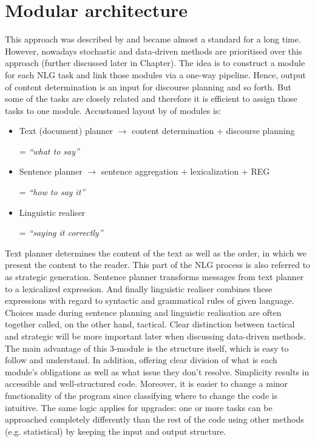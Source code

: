 \section{Modular architecture}\label{section:modules}
This approach was described by \cite{reiter1997building} and became almost a standard for a long time. However, nowadays stochastic and data-driven methods are prioritised over this approach (further discussed later in Chapter). The idea is to construct a module for each NLG task and link those modules via a one-way pipeline. Hence, output of content determination is an input for discourse planning and so forth. But some of the tasks are closely related and therefore it is efficient to assign those tasks to one module. Accustomed layout by \cite{reiter1997building} of modules is: 
\begin{itemize}
	\item Text (document) planner $\rightarrow$ content determination + discourse planning
	
	= \emph{“what to say”}
	\item Sentence planner $\rightarrow$ sentence aggregation + lexicalization + REG
	
	= \emph{“how to say it”}
	\item Linguistic realiser
	
	= \emph{“saying it correctly”}
\end{itemize}

Text planner determines the content of the text as well as the order, in which we present the content to the reader. This part of the NLG process is also referred to as strategic generation. Sentence planner transforms messages from text planner to a lexicalized expression. And finally linguistic realiser combines these expressions with regard to syntactic and grammatical rules of given language. Choices made during sentence planning and linguistic realisation are often together called, on the other hand, tactical. Clear distinction between tactical and strategic will be more important later when discussing data-driven methods.
The main advantage of this 3-module is the structure itself, which is easy to follow and understand. In addition, offering clear division of what is each module’s obligations as well as what issue they don’t resolve. Simplicity results in accessible and well-structured code. Moreover, it is easier to change a minor functionality of the program since classifying where to change the code is intuitive. The same logic applies for upgrades: one or more tasks can be approached completely differently than the rest of the code using other methods (e.g. statistical) by keeping the input and output structure.

